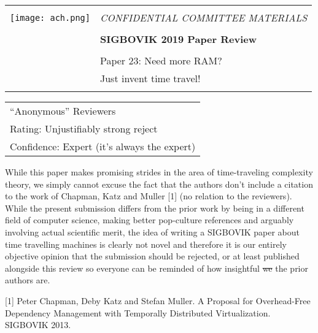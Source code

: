 \documentclass[12pt]{article}
\begin{document}
{\sffamily
\begin{tabular}{ll}
\multirow{3}{*}{\texttt{[image: ach.png]}}\\
& \Large{\em CONFIDENTIAL COMMITTEE MATERIALS} \\
&\\
& \textbf{\Huge{SIGBOVIK 2019 Paper Review}} \\
&\\
& \LARGE{Paper 23: Need more RAM?} \\[0.25em]
& \LARGE{Just invent time travel!} \\
&\\
\hline
\end{tabular}}
\vspace{2em}
\thispagestyle{empty}

{\large\bf
  \begin{tabular}{l}
    ``Anonymous'' Reviewers\\
Rating: Unjustifiably strong reject \\
Confidence: Expert (it's always the expert)\\
\end{tabular}}
\vspace{1em}

While this paper makes promising strides in the area of time-traveling
complexity theory, we simply cannot excuse the fact that the authors
don't include a citation to the work of Chapman, Katz and Muller [1] (no
relation to the reviewers). While the present submission differs from
the prior work by being in a different field of computer science, making
better pop-culture references and arguably involving actual scientific
merit, the idea of writing a SIGBOVIK paper about time travelling machines
is clearly
not novel and therefore it is our entirely objective opinion that the
submission should be rejected, or at least published alongside this
review so everyone can be reminded of how insightful \sout{we} the prior
authors are.

[1] Peter Chapman, Deby Katz and Stefan Muller. A Proposal for
Overhead-Free Dependency Management with Temporally Distributed
Virtualization. SIGBOVIK 2013.
\end{document}
